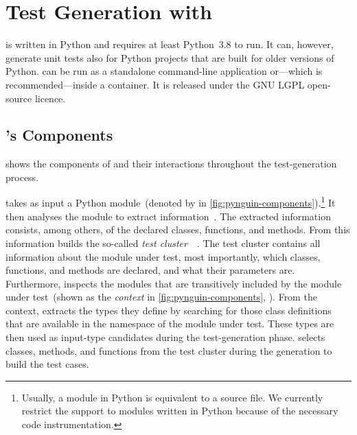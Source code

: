 \section{Test Generation with \pynguin}\label{sec:approach}


\Pynguin is written in Python
and requires at least Python~3.8 to run.
%
It can,
however,
generate unit tests also for Python projects
that are built for older versions of Python.
%
\Pynguin can be run as a standalone command-line application
or—which is recommended—inside a  container.
%
It is released under the GNU LGPL open-source licence.
%


\subsection{\pynguin's Components}\label{sec:approach-internal}

 shows the components of \pynguin 
and their interactions
throughout the test-generation process.
%

\Pynguin takes as input a Python module~(denoted
by 
 in \cref{fig:pynguin-components}).\footnote{%
  Usually, a module in Python is equivalent to a source file.
  We currently restrict the support to modules written in Python
  because of the necessary code instrumentation.%
}
%
It then analyses the module to extract information~.
%
The extracted information consists,
among others,
of the declared classes, functions, and methods.
%
From this information
\pynguin builds the so-called \emph{test cluster}~\cite{WL05}~.
%
The test cluster contains all information about the module under test,
most importantly,
which classes, functions, and methods are declared,
and what their parameters are.
%
Furthermore,
\pynguin inspects the modules
that are transitively included by the module under test~(shown
as the \emph{context} in \cref{fig:pynguin-components}, ).
%
From the context,
\pynguin extracts the types they define
by searching for those class definitions
that are available in the namespace of the module under test.
%
These types are then used as input-type candidates
during the test-generation phase.
%
\Pynguin selects classes, methods, and functions
from the test cluster during the generation
to build the test cases.
%

